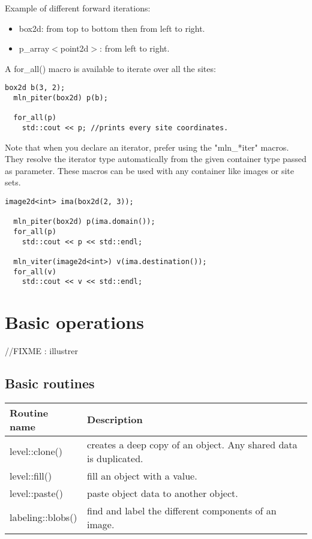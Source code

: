 \documentclass{report}
\begin{document}
Example of different forward iterations:
\begin{itemize}
  \item box2d: from top to bottom then from left to right.
  \item p\_array$<$point2d$>$: from left to right.
\end{itemize}

A for\_all() macro is available to iterate over all the sites: \\

\begin{lstlisting}[frame=single]
  box2d b(3, 2);
  mln_piter(box2d) p(b);

  for_all(p)
    std::cout << p; //prints every site coordinates.
\end{lstlisting}

Note that when you declare an iterator, prefer using the "mln\_*iter" macros.
They resolve the iterator type automatically from the given container type
passed as parameter. These macros can be used with any container like images or
site sets.

\begin{lstlisting}[frame=single]
  image2d<int> ima(box2d(2, 3));

  mln_piter(box2d) p(ima.domain());
  for_all(p)
    std::cout << p << std::endl;

  mln_viter(image2d<int>) v(ima.destination());
  for_all(v)
    std::cout << v << std::endl;
\end{lstlisting}


\chapter{Basic operations}
//FIXME : illustrer

\section{Basic routines}
\begin{tabular}{|l|p{8cm}|}
\hline
Routine name & Description \\ \hline
level::clone() & creates a deep copy of an object. Any shared data is
duplicated. \\ \hline

level::fill() & fill an object with a value. \\ \hline

level::paste() & paste object data to another object. \\ \hline

labeling::blobs() & find and label the different components of an image. \\
\hline
\end{tabular} \\
\end{document}
